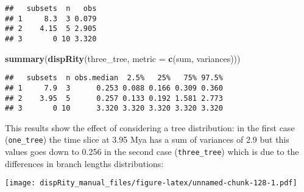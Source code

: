 \documentclass[
]{book}
\newenvironment{Shaded}{\begin{snugshade}}{\end{snugshade}}
\newcommand{\AttributeTok}[1]{\textcolor[rgb]{0.13,0.29,0.53}{#1}}
\newcommand{\ControlFlowTok}[1]{\textcolor[rgb]{0.13,0.29,0.53}{\textbf{#1}}}
\newcommand{\DecValTok}[1]{\textcolor[rgb]{0.00,0.00,0.81}{#1}}
\newcommand{\FloatTok}[1]{\textcolor[rgb]{0.00,0.00,0.81}{#1}}
\newcommand{\FunctionTok}[1]{\textcolor[rgb]{0.13,0.29,0.53}{\textbf{#1}}}
\newcommand{\NormalTok}[1]{#1}
\newcommand{\OtherTok}[1]{\textcolor[rgb]{0.56,0.35,0.01}{#1}}
\newcommand{\SpecialCharTok}[1]{\textcolor[rgb]{0.81,0.36,0.00}{\textbf{#1}}}
\begin{document}
\begin{verbatim}
##   subsets  n   obs
## 1     8.3  3 0.079
## 2    4.15  5 2.905
## 3       0 10 3.320
\end{verbatim}

\begin{Shaded}
\begin{Highlighting}[]
\FunctionTok{summary}\NormalTok{(}\FunctionTok{dispRity}\NormalTok{(three\_tree, }\AttributeTok{metric =} \FunctionTok{c}\NormalTok{(sum, variances)))}
\end{Highlighting}
\end{Shaded}

\begin{verbatim}
##   subsets  n obs.median  2.5%   25%   75% 97.5%
## 1     7.9  3      0.253 0.088 0.166 0.309 0.360
## 2    3.95  5      0.257 0.133 0.192 1.581 2.773
## 3       0 10      3.320 3.320 3.320 3.320 3.320
\end{verbatim}

This results show the effect of considering a tree distribution: in the first case (\texttt{one\_tree}) the time slice at 3.95 Mya has a sum of variances of 2.9 but this values goes down to 0.256 in the second case (\texttt{three\_tree}) which is due to the differences in branch lengths distributions:

\begin{Shaded}
\end{Shaded}

\texttt{[image: dispRity\_manual\_files/figure-latex/unnamed-chunk-128-1.pdf]}
\end{document}
